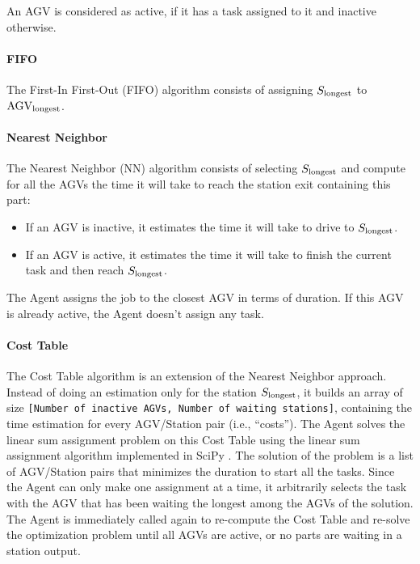 \documentclass[sn-mathphys]{sn-jnl}
\begin{document}
An AGV is considered as active, if it has a task assigned to it and inactive otherwise.

\paragraph{FIFO}

The First-In First-Out (FIFO) algorithm consists of assigning $S_{\rm longest}$ to $\text{AGV}_{\rm longest}$.

\paragraph{Nearest Neighbor}

The Nearest Neighbor (NN) algorithm consists of selecting $S_{\rm longest}$ and compute for all the AGVs the time it will take to reach the station exit containing this part:
\begin{itemize}
    \item If an AGV is inactive, it estimates the time it will take to drive to $S_{\rm longest}$.
    \item If an AGV is active, it estimates the time it will take to finish the current task and then reach $S_{\rm longest}$.
\end{itemize}

The Agent assigns the job to the closest AGV in terms of duration. If this AGV is already active, the Agent doesn’t assign any task.

\paragraph{Cost Table}

The Cost Table algorithm is an extension of the Nearest Neighbor approach. Instead of doing an estimation only for the station $S_{\rm longest}$, it builds an array of size \texttt{[Number of inactive AGVs, Number of waiting stations]}, containing the time estimation for every AGV/Station pair (i.e., “costs”). The Agent solves the linear sum assignment problem on this Cost Table using the linear sum assignment algorithm \cite{linearsumassignment} implemented in SciPy \cite{2020SciPy-NMeth}. The solution of the problem is a list of AGV/Station pairs that minimizes the duration to start all the tasks. Since the Agent can only make one assignment at a time, it arbitrarily selects the task with the AGV that has been waiting the longest among the AGVs of the solution. The Agent is immediately called again to re-compute the Cost Table and re-solve the optimization problem until all AGVs are active, or no parts are waiting in a station output.
\end{document}
